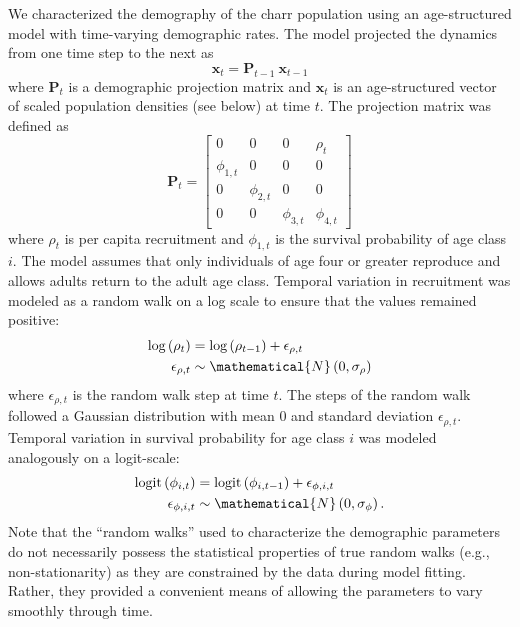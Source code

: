 We characterized the demography of the charr population using an age-structured model
with time-varying demographic rates.
The model projected the dynamics from one time step to the next as
%
\begin{equation} \label{eq:XPX}
    \mathbf{x}_t = \mathbf{P}_{t-1}~\mathbf{x}_{t-1}
\end{equation}
%
where $\mathbf{P}_{t}$ is a demographic projection matrix
and $\mathbf{x}_t$ is an age-structured vector of scaled population densities (see below)
at time $t$.
%
The projection matrix was defined as
%
\begin{equation} \label{eq:matrix}
\mathbf{P}_{t} = 
\left[
\begin{array}{cccccccc}
    0             & 0             & 0             & \rho_{t}     \\
    \phi_{1,t}    & 0             & 0             & 0            \\
    0             & \phi_{2,t}    & 0             & 0            \\
    0             & 0             & \phi_{3,t}    & \phi_{4,t}
    \end{array}
\right]
\end{equation}
%
where $\rho_{t}$ is per capita recruitment 
and $\phi_{1,t}$ is the survival probability of age class $i$. 
The model assumes that only individuals of age four or greater reproduce
and allows adults return to the adult age class.
%
Temporal variation in recruitment was modeled as a random walk on a log scale to ensure
that the values remained positive:
%
\begin{equation} \label{eq:rho}
\begin{aligned}
\text{log}\left(\rho_t\right) &= \text{log}\left(\rho_{t - 1}\right) + \epsilon_{\rho,t} \\
\epsilon_{\rho,t} &\sim \mathematical{N}\left(0, \sigma_{\rho} \right)
\end{aligned}
\end{equation}
%
where $\epsilon_{\rho,t}$ is the random walk step at time $t$.
The steps of the random walk followed a Gaussian distribution with mean 0 
and standard deviation $\epsilon_{\rho,t}$.
Temporal variation in survival probability for age class $i$ was modeled analogously 
on a logit-scale:
%
\begin{equation} \label{eq:phi}
\begin{aligned}
\text{logit}\left(\phi_{i, t}\right) &= \text{logit}\left(\phi_{i, t - 1}\right) +
                                          \epsilon_{\phi,i,t} \\
\epsilon_{\phi,i,t} &\sim \mathematical{N}\left(0, \sigma_{\phi} \right)\text{.}
\end{aligned}
\end{equation}
%
Note that the ``random walks'' used to characterize the demographic parameters 
do not necessarily possess the statistical properties 
of true random walks (e.g., non-stationarity) 
as they are constrained by the data during model fitting.
Rather, they provided a convenient means 
of allowing the parameters to vary smoothly through time.

